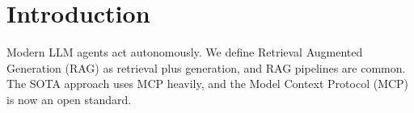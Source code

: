 \section{Introduction}
Modern LLM agents act autonomously. We define Retrieval Augmented Generation (RAG) as
retrieval plus generation, and RAG pipelines are common. The SOTA approach uses MCP
heavily, and the Model Context Protocol (MCP) is now an open standard.
